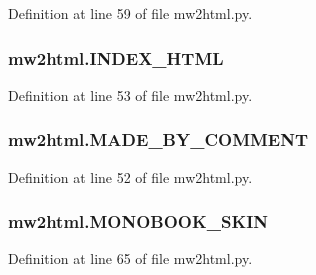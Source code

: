 Definition at line 59 of file mw2html.\+py.

\subsubsection[{\texorpdfstring{I\+N\+D\+E\+X\+\_\+\+H\+T\+ML}{INDEX_HTML}}]{\setlength{\rightskip}{0pt plus 5cm}mw2html.\+I\+N\+D\+E\+X\+\_\+\+H\+T\+ML}\hypertarget{namespacemw2html_a1172eca7f1e8a94d3f3e37d91d3bfa22}{}\label{namespacemw2html_a1172eca7f1e8a94d3f3e37d91d3bfa22}


Definition at line 53 of file mw2html.\+py.

\subsubsection[{\texorpdfstring{M\+A\+D\+E\+\_\+\+B\+Y\+\_\+\+C\+O\+M\+M\+E\+NT}{MADE_BY_COMMENT}}]{\setlength{\rightskip}{0pt plus 5cm}mw2html.\+M\+A\+D\+E\+\_\+\+B\+Y\+\_\+\+C\+O\+M\+M\+E\+NT}\hypertarget{namespacemw2html_af867388bb30ff9e3ab0a3cc2bf2159b5}{}\label{namespacemw2html_af867388bb30ff9e3ab0a3cc2bf2159b5}


Definition at line 52 of file mw2html.\+py.

\subsubsection[{\texorpdfstring{M\+O\+N\+O\+B\+O\+O\+K\+\_\+\+S\+K\+IN}{MONOBOOK_SKIN}}]{\setlength{\rightskip}{0pt plus 5cm}mw2html.\+M\+O\+N\+O\+B\+O\+O\+K\+\_\+\+S\+K\+IN}\hypertarget{namespacemw2html_a0f008e4b1e0268f9ef3546e5a4cafc9b}{}\label{namespacemw2html_a0f008e4b1e0268f9ef3546e5a4cafc9b}


Definition at line 65 of file mw2html.\+py.

